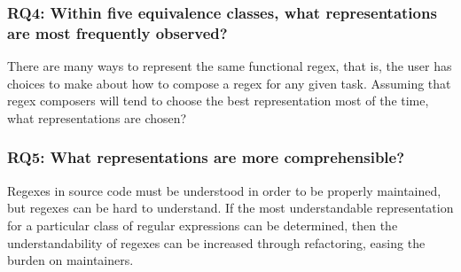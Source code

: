 \subsubsection{RQ4: Within five equivalence classes, what representations are most frequently observed?}

There are many ways to represent the same functional regex, that is, the user has choices to make about how to compose a regex for any given task.  Assuming that regex composers will tend to choose the best representation most of the time, what representations are chosen?

\subsubsection{RQ5: What representations are more comprehensible?}

Regexes in source code must be understood in order to be properly maintained, but regexes can be hard to understand.  If the most understandable representation for a particular class of regular expressions can be determined, then the understandability of regexes can be increased through refactoring, easing the burden on maintainers.
